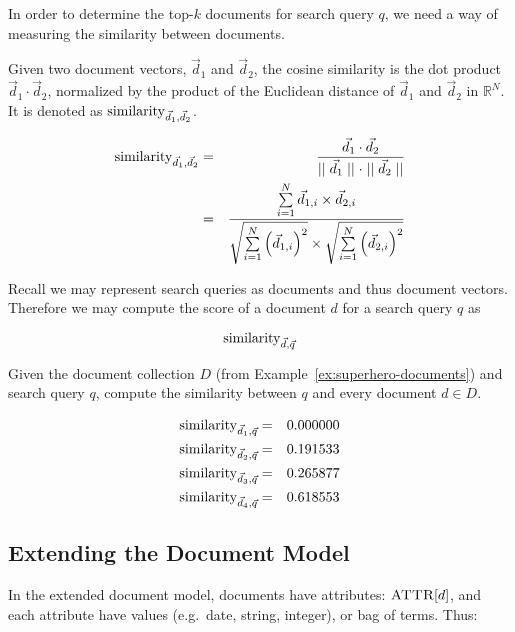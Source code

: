 		In order to determine the top-$k$ documents for search query $q$, we need a way of measuring the similarity between documents.
		
		\begin{defn}
			Given two document vectors, $\vec{d}_1$ and $\vec{d}_2$, the cosine similarity is the dot product $\vec{d}_1 \cdot \vec{d}_2$, normalized by the product of the Euclidean distance of $\vec{d}_1$ and $\vec{d}_2$ in $\mathbb{R}^N$.  It is denoted as $\operatorname{similarity}_{\vec{d}_1, \vec{d}_2}$.
			
			\begin{eqnarray}
				\operatorname{similarity}_{\vec{d}_1, \vec{d}_2} &=& \frac{\vec{d}_1 \cdot \vec{d}_2}{\mid\mid \vec{d}_1 \mid\mid \cdot \mid\mid \vec{d}_2 \mid\mid} \\
				 &=& \frac{\sum\limits_{i=1}^{N} \vec{d}_{1, i} \times \vec{d}_{2, i}}{\sqrt{\sum\limits_{i=1}^{N} \left(\vec{d}_{1, i}\right)^2} \times \sqrt{\sum\limits_{i=1}^{N} \left(\vec{d}_{2, i}\right)^2}}
			\end{eqnarray}
		\end{defn}
		
		Recall we may represent search queries as documents and thus document vectors.  Therefore we may compute the score of a document $d$ for a search query $q$ as
		
		$$\operatorname{similarity}_{\vec{d}, \vec{q}}$$
		
		\begin{ex}
			Given the document collection $D$ (from Example~\ref{ex:superhero-documents}) and search query $q$, compute the similarity between $q$ and every document $d \in D$.
			
			\begin{eqnarray}
				\operatorname{similarity}_{\vec{d}_1, \vec{q}} &=& 0.000000 \\
				\operatorname{similarity}_{\vec{d}_2, \vec{q}} &=& 0.191533 \\
				\operatorname{similarity}_{\vec{d}_3, \vec{q}} &=& 0.265877 \\
				\operatorname{similarity}_{\vec{d}_4, \vec{q}} &=& 0.618553
			\end{eqnarray}
		\end{ex}
		
	\subsection{Extending the Document Model}
		In the extended document model, documents have attributes: $\textsc{ATTR}\lbrack d\rbrack$, and each attribute have values (e.g.~date, string, integer), or bag of terms.  Thus:

